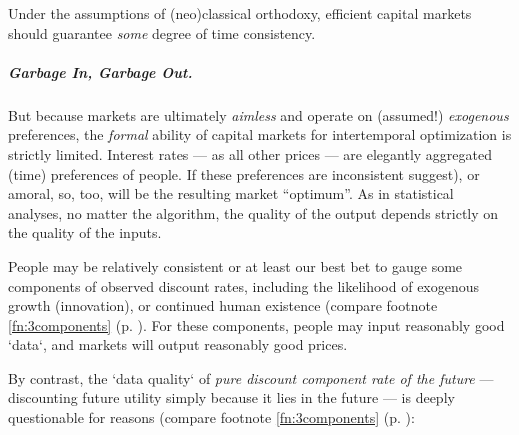 Under the assumptions of (neo)classical orthodoxy, efficient capital markets should guarantee \emph{some} degree of time consistency. 

\subparagraph{Garbage In, Garbage Out.} But because markets are ultimately \emph{aimless} and operate on (assumed!) \emph{exogenous} preferences, the \emph{formal} ability of capital markets for intertemporal optimization is strictly limited. Interest rates --- as all other prices --- are elegantly aggregated (time) preferences of people. If these preferences are inconsistent suggest), or amoral, so, too, will be the resulting market ``optimum''. As in statistical analyses, no matter the algorithm, the quality of the output depends strictly on the quality of the inputs.

People may be relatively consistent or at least our best bet to gauge some components of observed discount rates, including the likelihood of exogenous growth (innovation), or continued human existence (compare footnote \ref{fn:3components} (p. \pageref{fn:3components}). For these components, people may input reasonably good `data`, and markets will output reasonably good prices.

By contrast, the `data quality` of \emph{pure discount component rate of the future} --- discounting future utility simply because it lies in the future --- is deeply questionable for reasons (compare footnote \ref{fn:3components} (p. \pageref{fn:3components}):

